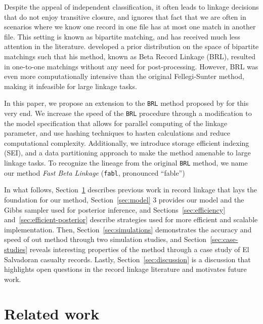 \documentclass[12pt,letterpaper]{article}
\newcommand{\1}[1]{\mathbb{I}\!\left[#1\right]} %
\begin{document}
Despite the appeal of independent classification, it often leads to linkage decisions that do not enjoy transitive closure, and ignores that fact that we are often in scenarios where we know one record in one file has at most one match in another file. This setting is known as bipartite matching, and has received much less attention in the literature. \citep{sadinle2017} developed a prior distribution on the space of bipartite matchings such that his method, known as Beta Record Linkage (BRL), resulted in one-to-one matchings without any need for post-processing. However, BRL was even more computationally intensive than the original Fellegi-Sunter method, making it infeasible for large linkage tasks. 

In this paper, we propose an extension to the \texttt{BRL} method proposed by \citep{sadinle2017} for this very end.  We increase the speed of the \texttt{BRL} procedure through a modification to the model specification that allows for parallel computing of the linkage parameter, and use hashing techniques to hasten calculations and reduce computational complexity. Additionally, we introduce storage efficient indexing (SEI), and a data partitioning approach to make the method amenable to large linkage tasks. To recognize the lineage from the original \texttt{BRL} method, we name our method \emph{Fast Beta Linkage} (\texttt{fabl},
pronounced ``fable'')

In what follows, Section~\ref{sec:related} describes previous work in record linkage that lays the foundation for our method, Section~\ref{sec:model}
3 provides our model and the Gibbs sampler used for posterior inference,
and Sections~\ref{sec:efficiency} and~\ref{sec:efficient-posterior} describe strategies used for more efficient and scalable
implementation. Then, Section~\ref{sec:simulations} demonstrates the accuracy and speed of
out method through two simulation studies, and Section~\ref{sec:case-studies} reveals
interesting properties of the method through a case study of El
Salvadoran casualty records. Lastly, Section~\ref{sec:discussion} is a discussion that highlights open
questions in the record linkage literature and motivates future work.


\section{Related work}
\label{sec:related}
\end{document}
